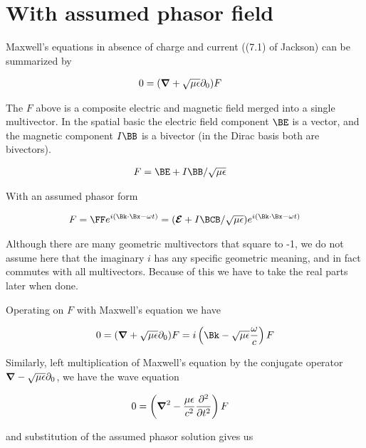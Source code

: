 \section{With assumed phasor field}

Maxwell's equations in absence of charge and current ((7.1) of Jackson) can be summarized by 

\begin{align}\label{eqn:foo1}
0 &= (\boldsymbol{\nabla} + \sqrt{\mu\epsilon}\partial_0) F 
\end{align}

The $F$ above is a composite electric and magnetic field merged into a single multivector.  In the spatial basic the electric field component $\BE$ is a vector, and the magnetic component $I\BB$ is a bivector (in the Dirac basis both are bivectors).

\begin{align}\label{eqn:foo0}
F &= \BE + I \BB/\sqrt{\mu\epsilon}
\end{align}

With an assumed phasor form

\begin{align}\label{eqn:foo2}
F = \FF e^{ i(\Bk \cdot \Bx - \omega t) } = (\EE + I\BCB/\sqrt{\mu\epsilon}) e^{ i(\Bk \cdot \Bx - \omega t) }
\end{align}

Although there are many geometric multivectors that square to -1, we do not assume here that the imaginary $i$ has any specific geometric meaning, and in fact commutes with all multivectors.  Because of this we have to take the real parts later when done.

Operating on $F$ with Maxwell's equation we have 

\begin{align}\label{eqn:foo3}
0 = (\spacegrad + \sqrt{\mu\epsilon}\partial_0) F = i \left( \Bk - \sqrt{\mu\epsilon}\frac{\omega}{c} \right) F 
\end{align}

Similarly, left multiplication of Maxwell's equation by the conjugate operator $\boldsymbol{\nabla} - \sqrt{\mu\epsilon}\partial_0$, we have the wave equation

\begin{align}\label{eqn:foo4}
0 &= \left(\boldsymbol{\nabla}^2 - \frac{\mu\epsilon}{c^2}\frac{\partial^2}{\partial t^2}\right) F 
\end{align}

and substitution of the assumed phasor solution gives us

